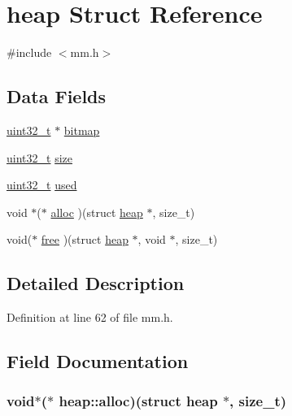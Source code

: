 \hypertarget{structheap}{\section{heap Struct Reference}
\label{structheap}
}


{\ttfamily \#include $<$mm.\+h$>$}

\subsection*{Data Fields}
\begin{DoxyCompactItemize}
\item 
\hyperlink{aplus_8h_a53a0df51603c77c2aa5b9ea61b606a82}{uint32\+\_\+t} $\ast$ \hyperlink{structheap_a5243ef46c552fc0968aa2bcdaf6725d1}{bitmap}
\item 
\hyperlink{aplus_8h_a53a0df51603c77c2aa5b9ea61b606a82}{uint32\+\_\+t} \hyperlink{structheap_a486fb531d24b9ee5f17b7ffe96689705}{size}
\item 
\hyperlink{aplus_8h_a53a0df51603c77c2aa5b9ea61b606a82}{uint32\+\_\+t} \hyperlink{structheap_a37f3f6d6d39562f3cca452eafebcd7ac}{used}
\item 
void $\ast$($\ast$ \hyperlink{structheap_a8b4bc8c3f0ed79efd52d61a27a62a130}{alloc} )(struct \hyperlink{structheap}{heap} $\ast$, size\+\_\+t)
\item 
void($\ast$ \hyperlink{structheap_ae53b14c50bbb9daab4346cd0873bda02}{free} )(struct \hyperlink{structheap}{heap} $\ast$, void $\ast$, size\+\_\+t)
\end{DoxyCompactItemize}


\subsection{Detailed Description}


Definition at line 62 of file mm.\+h.



\subsection{Field Documentation}
\hypertarget{structheap_a8b4bc8c3f0ed79efd52d61a27a62a130}{
\subsubsection[{alloc}]{\setlength{\rightskip}{0pt plus 5cm}void$\ast$($\ast$ heap\+::alloc)(struct {\bf heap} $\ast$, size\+\_\+t)}}\label{structheap_a8b4bc8c3f0ed79efd52d61a27a62a130}


